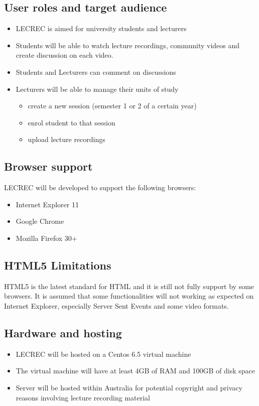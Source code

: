 \documentclass{article}
\begin{document}
\subsection{User roles and target audience}
\begin{itemize}
\item LECREC is aimed for university students and lecturers
\item Students will be able to watch lecture recordings, community videos and create discussion on each video.
\item Students and Lecturers can comment on discussions
\item Lecturers will be able to manage their units of study
\begin{itemize}
\item create a new session (semester 1 or 2 of a certain year)
\item enrol student to that session
\item upload lecture recordings
\end{itemize}
\end{itemize}

\subsection{Browser support}
LECREC will be developed to support the following browsers:
\begin{itemize}
\item Internet Explorer 11
\item Google Chrome
\item Mozilla Firefox 30+
\end{itemize}

\subsection{HTML5 Limitations}
HTML5 is the latest standard for HTML and it is still not fully support by some browsers. It is assumed that some functionalities will not working as expected on Internet Explorer, especially Server Sent Events and some video formats.

\subsection{Hardware and hosting}
\begin{itemize}
\item LECREC will be hosted on a Centos 6.5 virtual machine
\item The virtual machine will have at least 4GB of RAM and 100GB of disk space
\item Server will be hosted within Australia for potential copyright and privacy reasons involving lecture recording material
\end{itemize}
\end{document}
